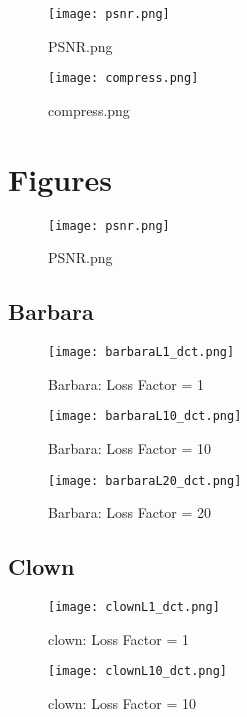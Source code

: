 \documentclass{article} %
\begin{document}
\begin{figure}[H]
\centering
\texttt{[image: psnr.png]}
\caption{PSNR.png}
\end{figure}

\begin{figure}[H]
\centering
\texttt{[image: compress.png]}
\caption{compress.png}
\end{figure}



\clearpage
\appendix

\section{Figures}
\label{ap:fig}

\begin{figure}[H]
\centering
\texttt{[image: psnr.png]}
\caption{PSNR.png}
\end{figure}

\subsection{Barbara}
\begin{figure}[H]
\centering
\texttt{[image: barbaraL1\_dct.png]}
\caption{Barbara: Loss Factor = 1}
\end{figure}

\begin{figure}[H]
\centering
\texttt{[image: barbaraL10\_dct.png]}
\caption{Barbara: Loss Factor = 10}
\end{figure}

\begin{figure}[H]
\centering
\texttt{[image: barbaraL20\_dct.png]}
\caption{Barbara: Loss Factor = 20}
\end{figure}

\subsection{Clown}
\begin{figure}[H]
\centering
\texttt{[image: clownL1\_dct.png]}
\caption{clown: Loss Factor = 1}
\end{figure}

\begin{figure}[H]
\centering
\texttt{[image: clownL10\_dct.png]}
\caption{clown: Loss Factor = 10}
\end{figure}
\end{document}
